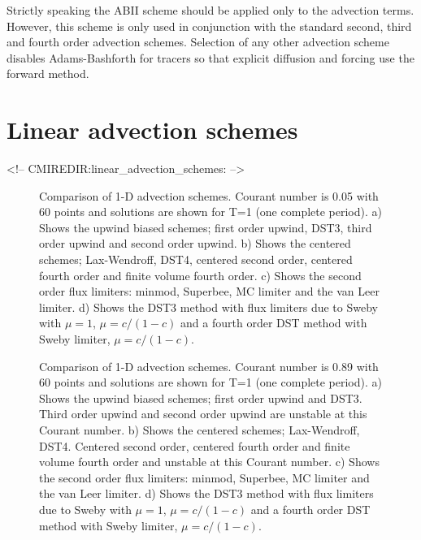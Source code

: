 
Strictly speaking the ABII scheme should be applied only to the
advection terms. However, this scheme is only used in conjunction with
the standard second, third and fourth order advection
schemes. Selection of any other advection scheme disables
Adams-Bashforth for tracers so that explicit diffusion and forcing use
the forward method.




\section{Linear advection schemes}
\label{sect:tracer-advection}
\begin{rawhtml}
<!-- CMIREDIR:linear_advection_schemes: -->
\end{rawhtml}

\begin{figure}
\caption{
Comparison of 1-D advection schemes. Courant number is 0.05 with 60
points and solutions are shown for T=1 (one complete period).
a) Shows the upwind biased schemes; first order upwind, DST3,
third order upwind and second order upwind.
b) Shows the centered schemes; Lax-Wendroff, DST4, centered second order,
centered fourth order and finite volume fourth order.
c) Shows the second order flux limiters: minmod, Superbee,
MC limiter and the van Leer limiter.
d) Shows the DST3 method with flux limiters due to Sweby with
$\mu=1$, $\mu=c/(1-c)$ and a fourth order DST method with Sweby limiter,
$\mu=c/(1-c)$.
\label{fig:advect-1d-lo}
}
\end{figure}

\begin{figure}
\caption{
Comparison of 1-D advection schemes. Courant number is 0.89 with 60
points and solutions are shown for T=1 (one complete period).
a) Shows the upwind biased schemes; first order upwind and DST3.
Third order upwind and second order upwind are unstable at this Courant number.
b) Shows the centered schemes; Lax-Wendroff, DST4. Centered second order,
centered fourth order and finite volume fourth order and unstable at this
Courant number.
c) Shows the second order flux limiters: minmod, Superbee,
MC limiter and the van Leer limiter.
d) Shows the DST3 method with flux limiters due to Sweby with
$\mu=1$, $\mu=c/(1-c)$ and a fourth order DST method with Sweby limiter,
$\mu=c/(1-c)$.
\label{fig:advect-1d-hi}
}
\end{figure}

